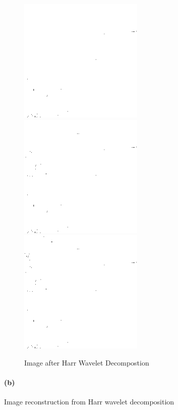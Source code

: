 \documentclass{article}
\newcommand{\spart}[1]{\paragraph{(#1)}}
\begin{document}
\begin{figure}[h!]
  \centering
  	\includegraphics[height=16em]{code/outputs/prob6a_1.png}
	\includegraphics[height=16em]{code/outputs/prob6a_2.png}
	\includegraphics[height=16em]{code/outputs/prob6a_3.png}
  \caption{Image after Harr Wavelet Decompostion}
\end{figure}


\spart{b} Image reconstruction from Harr wavelet decomposition
\end{document}
